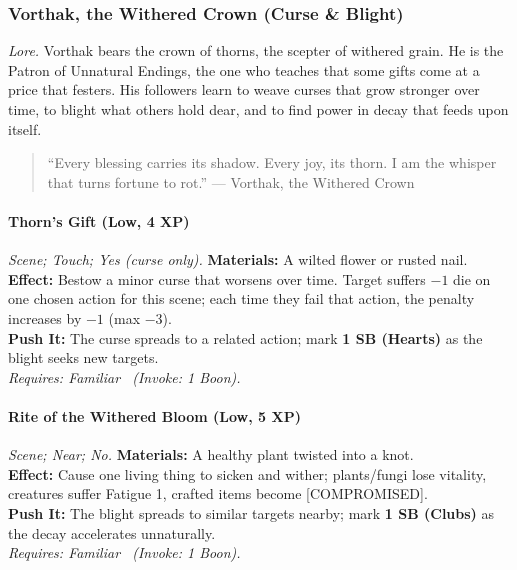 \subsubsection{Vorthak, the Withered Crown (Curse \& Blight)}
\textit{Lore.} Vorthak bears the crown of thorns, the scepter of withered grain. He is the Patron of Unnatural Endings, the one who teaches that some gifts come at a price that festers. His followers learn to weave curses that grow stronger over time, to blight what others hold dear, and to find power in decay that feeds upon itself.

\begin{quote}
``Every blessing carries its shadow. Every joy, its thorn. I am the whisper that turns fortune to rot.'' — Vorthak, the Withered Crown
\end{quote}

\paragraph{Thorn's Gift (Low, 4 XP)} \emph{Scene; Touch; Yes (curse only).}
\textbf{Materials:} A wilted flower or rusted nail.\\
\textbf{Effect:} Bestow a minor curse that worsens over time. Target suffers \(-1\) die on one chosen action for this scene; each time they fail that action, the penalty increases by \(-1\) (max \(-3\)).\\
\textbf{Push It:} The curse spreads to a related action; mark \textbf{1 SB (Hearts)} as the blight seeks new targets.\\
\emph{Requires: Familiar \ (\textit{Invoke:} 1 Boon).}

\paragraph{Rite of the Withered Bloom (Low, 5 XP)} \emph{Scene; Near; No.}
\textbf{Materials:} A healthy plant twisted into a knot.\\
\textbf{Effect:} Cause one living thing to sicken and wither; plants/fungi lose vitality, creatures suffer Fatigue 1, crafted items become [COMPROMISED].\\
\textbf{Push It:} The blight spreads to similar targets nearby; mark \textbf{1 SB (Clubs)} as the decay accelerates unnaturally.\\
\emph{Requires: Familiar \ (\textit{Invoke:} 1 Boon).}

